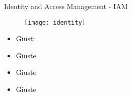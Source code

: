 \begin{tframe}{Identity and Access Management - IAM}
\begin{center}
\begin{minipage}{0.55\textwidth}
\begin{figure}[h]
\centering
\texttt{[image: identity]}
\end{figure}
\end{minipage}
\begin{minipage}{0.30\textwidth}
\begin{itemize}
\item Giusti 
\item Giuste 
\item Giusto 
\item Giuste 
\end{itemize}
\end{minipage}
\end{center}
\end{tframe}